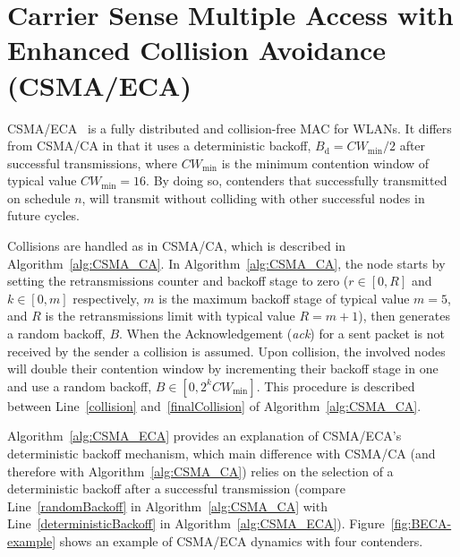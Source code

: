 \section{Carrier Sense Multiple Access with Enhanced Collision Avoidance (CSMA/ECA)}\label{introProtocol}

CSMA/ECA~\cite{barcelo2008lba} is a fully distributed and collision-free MAC for WLANs. It differs from CSMA/CA in that it uses a deterministic backoff, $B_{\text{d}}=CW_{\min}/2$ after successful transmissions, where $CW_{\min}$ is the minimum contention window of typical value $CW_{\min}=16$. By doing so, contenders that successfully transmitted on schedule $n$, will transmit without colliding with other successful nodes in future cycles.

Collisions are handled as in CSMA/CA, which is described in Algorithm~\ref{alg:CSMA_CA}. In Algorithm~\ref{alg:CSMA_CA}, the node starts by setting the retransmissions counter and backoff stage to zero ($r\in[0,R]$ and $k\in[0,m]$ respectively, $m$ is the maximum backoff stage of typical value $m=5$, and $R$ is the retransmissions limit with typical value $R=m+1$), then generates a random backoff, $B$. When the Acknowledgement (\emph{ack}) for a sent packet is not received by the sender a collision is assumed. Upon collision, the involved nodes will double their contention window by incrementing their backoff stage in one and use a random backoff, $B\in[0,2^{k}CW_{\min}]$. This procedure is described between Line~\ref{collision} and~\ref{finalCollision} of Algorithm~\ref{alg:CSMA_CA}.

Algorithm~\ref{alg:CSMA_ECA} provides an explanation of CSMA/ECA's deterministic backoff mechanism, which main difference with CSMA/CA (and therefore with Algorithm~\ref{alg:CSMA_CA}) relies on the selection of a deterministic backoff after a successful transmission (compare Line~\ref{randomBackoff} in Algorithm~\ref{alg:CSMA_CA} with Line~\ref{deterministicBackoff} in Algorithm~\ref{alg:CSMA_ECA}). Figure~\ref{fig:BECA-example} shows an example of CSMA/ECA dynamics with four contenders.

